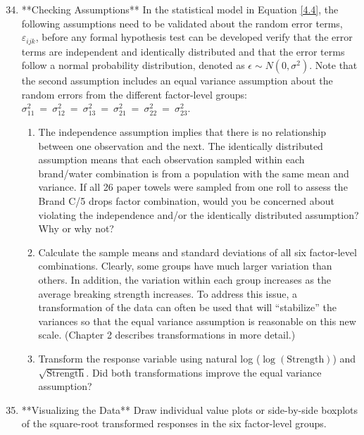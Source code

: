 \documentclass[
]{report}
\begin{document}
\begin{enumerate}
  \setcounter{enumi}{33}

  \item **Checking Assumptions** In the statistical model in Equation \ref{4.4}, the following assumptions need to be validated about the random error terms, $\scriptstyle \varepsilon_{ijk}$, before any formal hypothesis test can be developed verify that the error terms are independent and identically distributed and that the error terms follow a normal probability distribution, denoted as $\scriptstyle \epsilon \sim N(0, \sigma^2)$. Note that the second assumption includes an equal variance assumption about the random errors from the different factor-level groups: $\scriptstyle \sigma_{11}^2 \ =\  \sigma_{12}^2 \ =\ \sigma_{13}^2 \ =\  \sigma_{21}^2 \ =\  \sigma_{22}^2 \ =\  \sigma_{23}^2$.

\begin{enumerate}
  \item The independence assumption implies that there is no relationship between one observation and the next. The identically distributed assumption means that each observation sampled within each brand/water combination is from a population with the same mean and variance. If all 26 paper towels were sampled from one roll to assess the Brand C/5 drops factor combination, would you be concerned about violating the independence and/or the identically distributed assumption? Why or why not?
  \item Calculate the sample means and standard deviations of all six factor-level combinations. Clearly, some groups have much larger variation than others. In addition, the variation within each group increases as the average breaking strength increases. To address this issue, a transformation of the data can often be used that will “stabilize” the variances so that the equal variance assumption is reasonable on this new scale. (Chapter 2 describes transformations in more detail.)
  \item Transform the response variable using natural log ($\scriptstyle \log(\text{Strength})$) and $\scriptstyle \sqrt{\text{Strength}}$. Did both transformations improve the equal variance assumption?
\end{enumerate}

\item **Visualizing the Data** Draw individual value plots or side-by-side boxplots of the square-root transformed responses in the six factor-level groups.


\end{enumerate}
\end{document}
